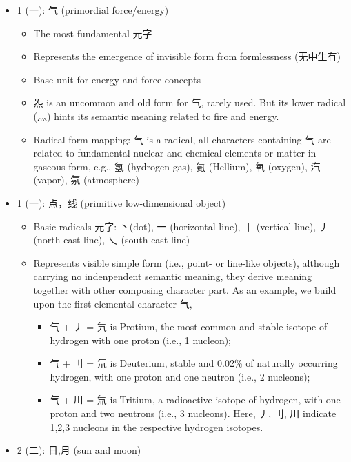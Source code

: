\begin{itemize}
\tightlist
\item
  1 (一): 气 (primordial force/energy)

  \begin{itemize}
  \tightlist
  \item
    The most fundamental 元字
  \item
    Represents the emergence of invisible form from formlessness
    (无中生有)
  \item
    Base unit for energy and force concepts
  \item
    炁 is an uncommon and old form for 气, rarely used. But its lower
    radical (灬) hints its semantic meaning related to fire and energy.
  \item
    Radical form mapping: 气 is a radical, all characters containing 气
    are related to fundamental nuclear and chemical elements or matter
    in gaseous form, e.g., 氢 (hydrogen gas), 氦 (Hellium), 氧 (oxygen),
    汽 (vapor), 氛 (atmosphere)
  \end{itemize}
\item
  1 (一): 点，线 (primitive low-dimensional object)

  \begin{itemize}
  \tightlist
  \item
    Basic radicals 元字: 丶(dot), 一 (horizontal line), 丨 (vertical
    line), 丿 (north-east line), 乀 (south-east line)
  \item
    Represents visible simple form (i.e., point- or line-like objects),
    although carrying no indenpendent semantic meaning, they derive
    meaning together with other composing character part. As an example,
    we build upon the first elemental character 气,

    \begin{itemize}
    \tightlist
    \item
      气 + 丿 = 氕 is Protium, the most common and stable isotope of
      hydrogen with one proton (i.e., 1 nucleon);
    \item
      气 + 刂 = 氘 is Deuterium, stable and 0.02\% of naturally
      occurring hydrogen, with one proton and one neutron (i.e., 2
      nucleons);
    \item
      气 + 川 = 氚 is Tritium, a radioactive isotope of hydrogen, with
      one proton and two neutrons (i.e., 3 nucleons). Here, 丿, 刂, 川
      indicate 1,2,3 nucleons in the respective hydrogen isotopes.
    \end{itemize}
  \end{itemize}
\item
  2 (二): 日,月 (sun and moon)


\end{itemize}
